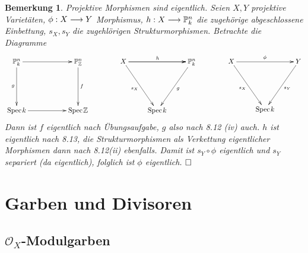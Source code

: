 \documentclass[11pt]{book}
\newtheorem{remark}[theorem]{Bemerkung}
\theoremstyle{nonumberbreak}
\newenvironment{pr}[1][]{\ifthenelse{\equal{#1}{}}{\proof}{\proof[#1]}\rm}{\endproof}
\newcommand{\spec}{\mathrm{Spec} \hspace{1pt} }
\begin{document}
\begin{spacing}{1.4}
\begin{remark}
Projektive Morphismen sind eigentlich.
\begin{pr}
Seien $X,Y$ projektive Varietäten, $\phi:X \longrightarrow Y$ Morphismus, $h: X \longrightarrow \mathbb{P}_k^n$ die zugehörige abgeschlossene Einbettung, $s_X, s_Y$ die zugehlörigen Strukturmorphismen. Betrachte die Diagramme
$$
\begin{xy}
\xymatrix{
\mathbb{P}_k^n \ar[dd]_{g} \ar[rr] && \mathbb{P}_{\mathbb{Z}}^n \ar[dd]^{f} \\ && \\ \spec k \ar[rr] && \spec \mathbb{Z}
}
\end{xy}
\qquad \qquad
\begin{xy}
\xymatrix{
X \ar[rr] \ar[rdd]_{s_X} \ar[rr]^{h} && \mathbb{P}_{k}^n \ar[ldd]^{g} \\ && \\ & \spec k & 
}
\end{xy}
\qquad \qquad
\begin{xy}
\xymatrix{
X \ar[rr]^{\phi} \ar[rdd]_{s_X} && Y \ar[ldd]^{s_Y} \\ && \\ & \spec k &
}
\end{xy}
$$
Dann ist $f$ eigentlich nach Übungsaufgabe, $g$ also nach 8.12 (iv) auch. $h$ ist eigentlich nach 8.13, die Strukturmorphismen als Verkettung eigentlicher Morphismen dann nach 8.12(ii) ebenfalls. Damit ist $s_Y \circ \phi$ eigentlich und $s_Y$ separiert (da eigentlich), folglich ist $\phi$ eigentlich. $\hfill \Box$


\end{pr}
\end{remark}



















\chapter{Garben und Divisoren} %
\setlength\abovedisplayshortskip{0pt}
\setlength\belowdisplayshortskip{10pt}
\setlength\abovedisplayskip{10pt}
\setlength\belowdisplayskip{10pt}

\setcounter{section}{8}
\renewcommand*\thesection{§ \arabic{section}\quad}
\section{$\mathcal{O}_X$-Modulgarben} %
\renewcommand*\thesection{\arabic{section}}
\thispagestyle{empty}






\end{spacing}
\end{document}

